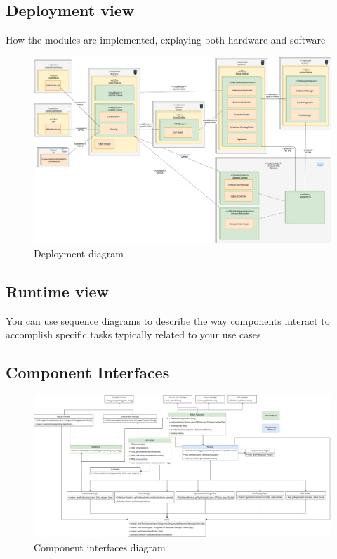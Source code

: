\documentclass{article}
\begin{document}
	\subsection{Deployment view} How the modules are implemented, explaying both hardware and software
	\begin{figure}[H]
		\includegraphics[width=\linewidth]{images/Deployment_diagram.png}
		\caption{Deployment diagram}
	\end{figure}
	\subsection{Runtime view}	You	can	use	sequence	diagrams	to	describe	the	way	components	interact	
to	accomplish	specific	tasks	typically	related	to	your	use	cases
	\subsection{Component Interfaces}
		\begin{figure}[H]
			\includegraphics[width=\linewidth]{images/Interface_diagram.png}
			\caption{Component interfaces diagram}
		\end{figure}
\end{document}
